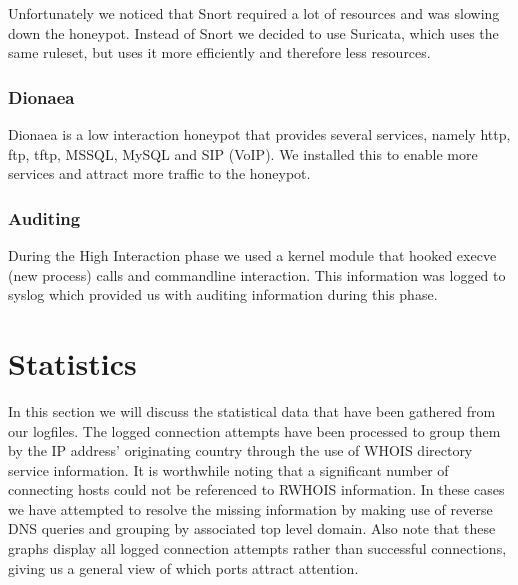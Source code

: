\documentclass[11pt]{article}
\begin{document}
Unfortunately we noticed that Snort required a lot of resources and was slowing down the honeypot. Instead of Snort we decided to use Suricata, which uses the same ruleset, but uses it more efficiently and therefore less resources.

\subsubsection{Dionaea}
Dionaea is a low interaction honeypot that provides several services, namely http, ftp, tftp, MSSQL, MySQL and SIP (VoIP). We installed this to enable more services and attract more traffic to the honeypot. 


\subsubsection{Auditing}
During the High Interaction phase we used a kernel module that hooked execve (new process) calls and commandline interaction. This information was logged to syslog which provided us with auditing information during this phase.



\section{Statistics}
\label{Statistics}
In this section we will discuss the statistical data that have been gathered from our logfiles. 
The logged connection attempts have been processed to group them by the IP address' originating country through the use of WHOIS directory service information.
It is worthwhile noting that a significant number of connecting hosts could not be referenced to RWHOIS information.
In these cases we have attempted to resolve the missing information by making use of reverse DNS queries and grouping by associated top level domain.
Also note that these graphs display all logged connection attempts rather than successful connections, giving us a general view of which ports attract attention.
\end{document}
